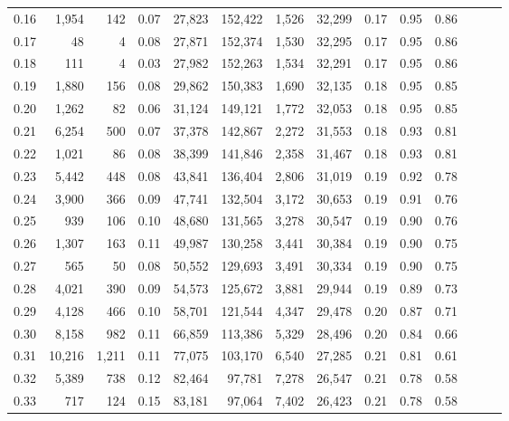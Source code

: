 \begin{tabular}{rrrrrrrrrrrrrr}
0.16 &   1,954 &    142 &  0.07 &   27,823 &  152,422 &   1,526 &  32,299 &  0.17 &  0.95 &      0.86 \\
0.17 &      48 &      4 &  0.08 &   27,871 &  152,374 &   1,530 &  32,295 &  0.17 &  0.95 &      0.86 \\
0.18 &     111 &      4 &  0.03 &   27,982 &  152,263 &   1,534 &  32,291 &  0.17 &  0.95 &      0.86 \\
0.19 &   1,880 &    156 &  0.08 &   29,862 &  150,383 &   1,690 &  32,135 &  0.18 &  0.95 &      0.85 \\
0.20 &   1,262 &     82 &  0.06 &   31,124 &  149,121 &   1,772 &  32,053 &  0.18 &  0.95 &      0.85 \\
0.21 &   6,254 &    500 &  0.07 &   37,378 &  142,867 &   2,272 &  31,553 &  0.18 &  0.93 &      0.81 \\
0.22 &   1,021 &     86 &  0.08 &   38,399 &  141,846 &   2,358 &  31,467 &  0.18 &  0.93 &      0.81 \\
0.23 &   5,442 &    448 &  0.08 &   43,841 &  136,404 &   2,806 &  31,019 &  0.19 &  0.92 &      0.78 \\
0.24 &   3,900 &    366 &  0.09 &   47,741 &  132,504 &   3,172 &  30,653 &  0.19 &  0.91 &      0.76 \\
0.25 &     939 &    106 &  0.10 &   48,680 &  131,565 &   3,278 &  30,547 &  0.19 &  0.90 &      0.76 \\
0.26 &   1,307 &    163 &  0.11 &   49,987 &  130,258 &   3,441 &  30,384 &  0.19 &  0.90 &      0.75 \\
0.27 &     565 &     50 &  0.08 &   50,552 &  129,693 &   3,491 &  30,334 &  0.19 &  0.90 &      0.75 \\
0.28 &   4,021 &    390 &  0.09 &   54,573 &  125,672 &   3,881 &  29,944 &  0.19 &  0.89 &      0.73 \\
0.29 &   4,128 &    466 &  0.10 &   58,701 &  121,544 &   4,347 &  29,478 &  0.20 &  0.87 &      0.71 \\
0.30 &   8,158 &    982 &  0.11 &   66,859 &  113,386 &   5,329 &  28,496 &  0.20 &  0.84 &      0.66 \\
0.31 &  10,216 &  1,211 &  0.11 &   77,075 &  103,170 &   6,540 &  27,285 &  0.21 &  0.81 &      0.61 \\
0.32 &   5,389 &    738 &  0.12 &   82,464 &   97,781 &   7,278 &  26,547 &  0.21 &  0.78 &      0.58 \\
0.33 &     717 &    124 &  0.15 &   83,181 &   97,064 &   7,402 &  26,423 &  0.21 &  0.78 &      0.58 \\

\end{tabular}
